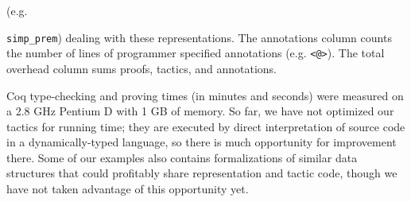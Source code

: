 \documentclass[preprint,nocopyrightspace]{sigplanconf}
\newcommand{\cd}[1]{\texttt{#1}}
\begin{document}
(e.g. {\cd{simp\_prem}) dealing with these representations.
The annotations column counts the number of lines of
programmer specified annotations (e.g. \cd{<@>}).  The total
overhead column sums proofs, tactics, and annotations.


Coq type-checking and proving times (in minutes and seconds) were measured
on a 2.8 GHz Pentium D with 1 GB of memory.  So far, we have not
optimized our tactics for running time; they are executed by direct
interpretation of source code in a dynamically-typed language, so
there is much opportunity for improvement there.  Some of our examples
also contains formalizations of similar data structures that could
profitably share representation and tactic code, though we have not
taken advantage of this opportunity yet.

}
\end{document}

